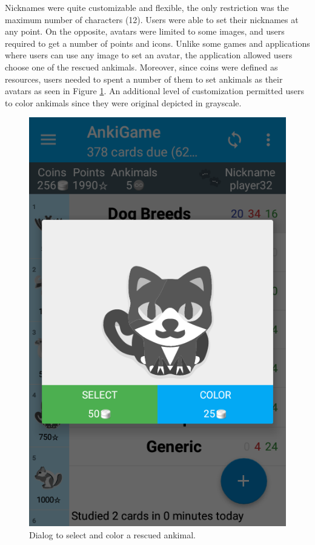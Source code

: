 Nicknames were quite customizable and flexible, the only restriction was the maximum number of characters (12). Users were able to set their nicknames at any point. On the opposite, avatars were limited to some images, and users required to get a number of points and icons. Unlike some games and applications where users can use any image to set an avatar, the application allowed users choose one of the rescued ankimals. Moreover, since coins were defined as resources, users needed to spent a number of them to set ankimals as their avatars as seen in Figure \ref{fig:ankimals-select}. An additional level of customization permitted users to color ankimals since they were original depicted in grayscale.

\begin{figure}[htb]
    \vskip 5mm
        \begin{center}
            \includegraphics[scale=0.4]{./Figures/ankimal_selection.png}
            \caption{Dialog to select and color a rescued ankimal.}
            \label{fig:ankimals-select}
        \end{center}
    \vskip -5mm
\end{figure}

